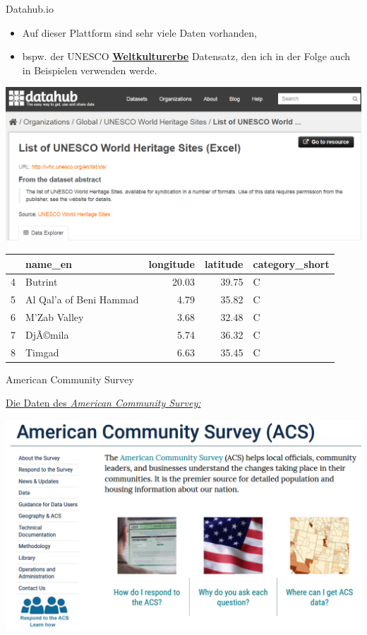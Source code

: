 \documentclass[ignorenonframetext,]{beamer}
\providecommand{\tightlist}{%
  \setlength{\itemsep}{0pt}\setlength{\parskip}{0pt}}
\begin{document}
\begin{frame}{Datahub.io}
\protect\hypertarget{datahub.io}{}

\begin{itemize}
\tightlist
\item
  Auf dieser Plattform sind sehr viele Daten vorhanden,
\item
  bspw. der UNESCO
  \href{http://datahub.io/dataset/unesco-world-heritage-sites/resource/d4116195-44d8-4bc1-9f91-9b570870dc19}{\textbf{Weltkulturerbe}}
  Datensatz, den ich in der Folge auch in Beispielen verwenden werde.
\end{itemize}

\includegraphics{figure/datahub_whc.PNG}

\begin{longtable}[]{@{}llrrl@{}}
\toprule
& name\_en & longitude & latitude & category\_short\tabularnewline
\midrule
\endhead
4 & Butrint & 20.03 & 39.75 & C\tabularnewline
5 & Al Qal'a of Beni Hammad & 4.79 & 35.82 & C\tabularnewline
6 & M'Zab Valley & 3.68 & 32.48 & C\tabularnewline
7 & DjÃ©mila & 5.74 & 36.32 & C\tabularnewline
8 & Timgad & 6.63 & 35.45 & C\tabularnewline
\bottomrule
\end{longtable}

\end{frame}

\begin{frame}{American Community Survey}
\protect\hypertarget{american-community-survey}{}

\begin{block}{\href{http://www.census.gov/acs/www/}{Die Daten des
\emph{American Community Survey:}}}

\includegraphics{figure/ACS.PNG}

\end{block}

\end{frame}
\end{document}
